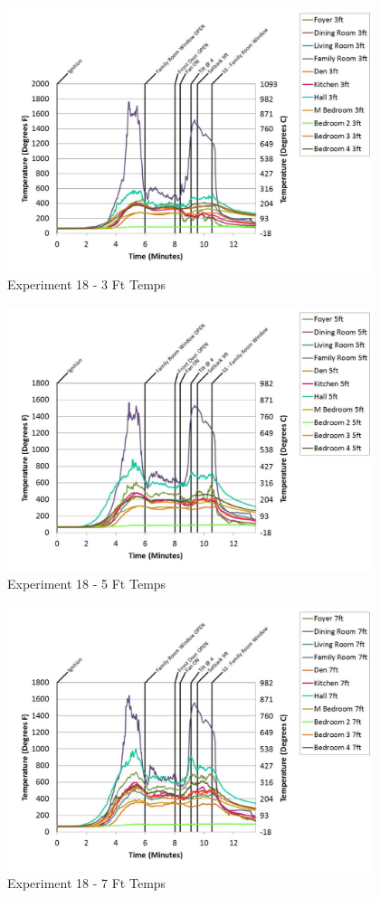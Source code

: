 \documentclass{article}
\begin{document}
\begin{appendices}
	\begin{figure}[h!]
		\centering
		\includegraphics[height=3.05in]{0_Images/Results_Charts/Exp_18_Charts/3FtTemps.pdf}
		\caption{Experiment 18 - 3 Ft Temps}
	\end{figure}
 
	\clearpage

	\begin{figure}[h!]
		\centering
		\includegraphics[height=3.05in]{0_Images/Results_Charts/Exp_18_Charts/5FtTemps.pdf}
		\caption{Experiment 18 - 5 Ft Temps}
	\end{figure}
 

	\begin{figure}[h!]
		\centering
		\includegraphics[height=3.05in]{0_Images/Results_Charts/Exp_18_Charts/7FtTemps.pdf}
		\caption{Experiment 18 - 7 Ft Temps}
	\end{figure}
 

\end{appendices}
\end{document}
